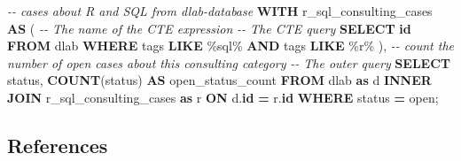 \documentclass[
]{book}
\newenvironment{Shaded}{\begin{snugshade}}{\end{snugshade}}
\newcommand{\CommentTok}[1]{\textcolor[rgb]{0.56,0.35,0.01}{\textit{#1}}}
\newcommand{\FunctionTok}[1]{\textcolor[rgb]{0.13,0.29,0.53}{\textbf{#1}}}
\newcommand{\KeywordTok}[1]{\textcolor[rgb]{0.13,0.29,0.53}{\textbf{#1}}}
\newcommand{\NormalTok}[1]{#1}
\newcommand{\OperatorTok}[1]{\textcolor[rgb]{0.81,0.36,0.00}{\textbf{#1}}}
\newcommand{\StringTok}[1]{\textcolor[rgb]{0.31,0.60,0.02}{#1}}
\begin{document}
\begin{Shaded}
\begin{Highlighting}[]
\CommentTok{{-}{-} cases about R and SQL from dlab{-}database }
\KeywordTok{WITH}\NormalTok{ r\_sql\_consulting\_cases }\KeywordTok{AS}\NormalTok{ ( }\CommentTok{{-}{-} The name of the CTE expression }
  \CommentTok{{-}{-} The CTE query }
  \KeywordTok{SELECT}
    \KeywordTok{id} 
  \KeywordTok{FROM} 
\NormalTok{    dlab }
  \KeywordTok{WHERE}
\NormalTok{    tags }\KeywordTok{LIKE} \StringTok{\textquotesingle{}\%sql\%\textquotesingle{}}
  \KeywordTok{AND}
\NormalTok{    tags }\KeywordTok{LIKE} \StringTok{\textquotesingle{}\%r\%\textquotesingle{}}
\NormalTok{),}
\CommentTok{{-}{-} count the number of open cases about this consulting category }
\CommentTok{{-}{-} The outer query }
\KeywordTok{SELECT}\NormalTok{ status, }\FunctionTok{COUNT}\NormalTok{(status) }\KeywordTok{AS}\NormalTok{ open\_status\_count}
\KeywordTok{FROM}\NormalTok{ dlab }\KeywordTok{as}\NormalTok{ d }
\KeywordTok{INNER} \KeywordTok{JOIN}\NormalTok{ r\_sql\_consulting\_cases }\KeywordTok{as}\NormalTok{ r}
  \KeywordTok{ON}\NormalTok{ d.}\KeywordTok{id} \OperatorTok{=}\NormalTok{ r.}\KeywordTok{id} 
\KeywordTok{WHERE}\NormalTok{ status }\OperatorTok{=} \StringTok{\textquotesingle{}open\textquotesingle{}}\NormalTok{; }
\end{Highlighting}
\end{Shaded}

\subsection{References}\label{references-5}
\end{document}
